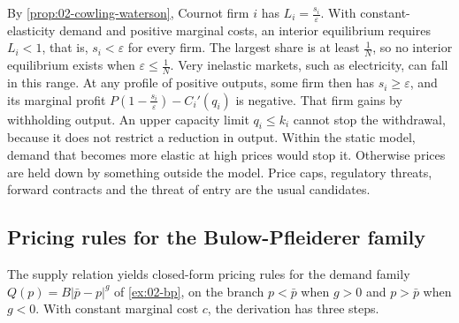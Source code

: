 \begin{remark}\label{rem:02-inelastic}
By \cref{prop:02-cowling-waterson}, Cournot firm $i$ has $L_i = \frac{s_i}{\varepsilon}$. With constant-elasticity
demand and positive marginal costs, an interior equilibrium requires $L_i < 1$, that is, $s_i < \varepsilon$ for every
firm. The largest share is at least $\frac{1}{N}$, so no interior equilibrium exists when $\varepsilon \le
\frac{1}{N}$. Very inelastic markets, such as electricity, can fall in this range. At any profile of positive
outputs, some firm then has $s_i \ge \varepsilon$, and its marginal profit $P\left(1 -
\frac{s_i}{\varepsilon}\right) - C_i'(q_i)$ is negative. That firm gains by withholding output. An upper capacity
limit $q_i \le k_i$ cannot stop the withdrawal, because it does not restrict a reduction in output. Within the
static model, demand that becomes more elastic at high prices would stop it. Otherwise prices are held down by
something outside the model. Price caps, regulatory threats, forward contracts and the threat of entry are the
usual candidates.
\end{remark}

\subsection{Pricing rules for the Bulow-Pfleiderer family}\label{sec:02-bp-rules}

The supply relation yields closed-form pricing rules for the demand family $Q(p) = B\lvert\bar p - p\rvert^{g}$
of \cref{ex:02-bp}, on the branch $p < \bar p$ when $g > 0$ and $p > \bar p$ when $g < 0$. With constant marginal
cost $c$, the derivation has three steps.

